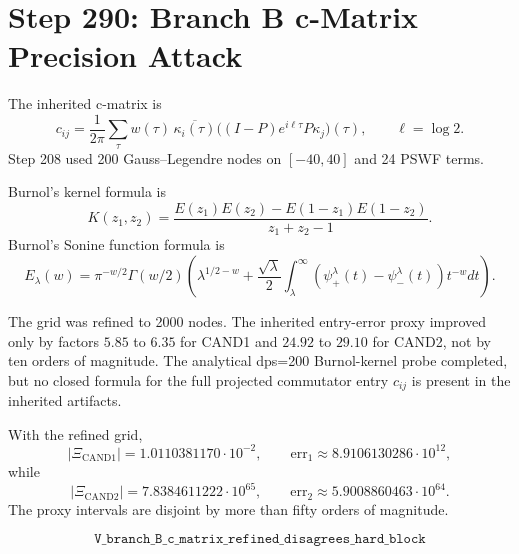 \section*{Step 290: Branch B c-Matrix Precision Attack}

The inherited c-matrix is
\[
c_{ij}=\frac{1}{2\pi}\sum_\tau w(\tau)\,
\overline{\kappa_i(\tau)}
\big((I-P)e^{i\ell\tau}P\kappa_j\big)(\tau),
\qquad \ell=\log 2.
\]
Step 208 used 200 Gauss--Legendre nodes on \([-40,40]\) and 24 PSWF terms.

Burnol's kernel formula is
\[
K(z_1,z_2)=
\frac{E(z_1)E(z_2)-E(1-z_1)E(1-z_2)}{z_1+z_2-1}.
\]
Burnol's Sonine function formula is
\[
E_\lambda(w)=\pi^{-w/2}\Gamma(w/2)\left(
\lambda^{1/2-w}+\frac{\sqrt{\lambda}}{2}
\int_\lambda^\infty(\psi_+^\lambda(t)-\psi_-^\lambda(t))t^{-w}dt
\right).
\]

The grid was refined to 2000 nodes.  The inherited entry-error proxy improved
only by factors \(5.85\) to \(6.35\) for CAND1 and \(24.92\) to \(29.10\) for
CAND2, not by ten orders of magnitude.  The analytical dps=200 Burnol-kernel
probe completed, but no closed formula for the full projected commutator entry
\(c_{ij}\) is present in the inherited artifacts.

With the refined grid,
\[
|\Xi_{\mathrm{CAND1}}|=1.0110381170\cdot 10^{-2},
\qquad
\mathrm{err}_{1}\approx 8.9106130286\cdot 10^{12},
\]
while
\[
|\Xi_{\mathrm{CAND2}}|=7.8384611222\cdot 10^{65},
\qquad
\mathrm{err}_{2}\approx 5.9008860463\cdot 10^{64}.
\]
The proxy intervals are disjoint by more than fifty orders of magnitude.

\[
\boxed{\texttt{V\_branch\_B\_c\_matrix\_refined\_disagrees\_hard\_block}}
\]
